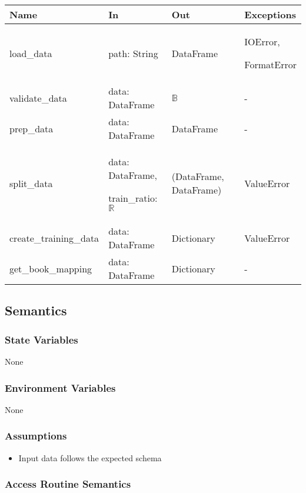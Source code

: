 \documentclass[12pt, titlepage]{article}
\begin{document}
\begin{center}
  \begin{tabular}{p{4cm} p{4cm} p{4cm} p{2cm}}
  \hline
  \textbf{Name} & \textbf{In} & \textbf{Out} & \textbf{Exceptions} \\
  \hline
  load\_data & path: String &  DataFrame & IOError,
  
  FormatError\\
  \hline
  validate\_data & data: DataFrame &  $\mathbb{B}$ & -\\
  \hline
  prep\_data & data: DataFrame &  DataFrame & - \\
  \hline
  split\_data & data: DataFrame,
  
  train\_ratio: $\mathbb{R}$ &  (DataFrame, DataFrame) & ValueError \\
  \hline
  create\_training\_data & data: DataFrame & Dictionary & ValueError \\
  \hline
  get\_book\_mapping & data: DataFrame & Dictionary & - \\
  \hline
  \end{tabular}
  \end{center}


\subsection{Semantics}

\subsubsection{State Variables}
None

\subsubsection{Environment Variables}

None

\subsubsection{Assumptions}

\begin{itemize}
  \item Input data follows the expected schema
\end{itemize}
\subsubsection{Access Routine Semantics}
\end{document}
